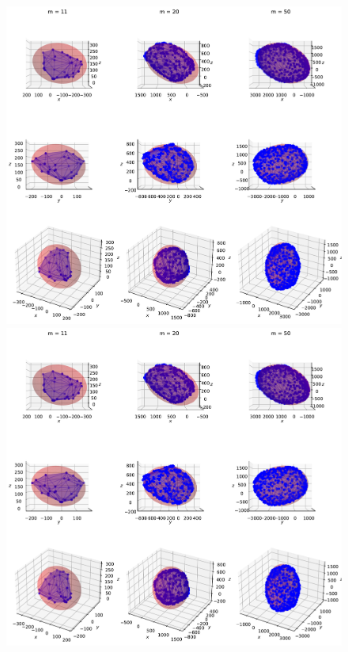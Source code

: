 \begin{figure}[!htb]
\begin{minipage}{1\linewidth}
        \includegraphics[trim={0 500 0 60},clip, width=0.9\linewidth]{img/chapter_3/myIma5_projection_constant.pdf}
    \end{minipage}
    \begin{minipage}{1\linewidth}
        \centering
        \includegraphics[trim={0 255 0 300},clip, width=0.9\linewidth]{img/chapter_3/myIma5_projection_constant.pdf}
    \end{minipage}
    \begin{minipage}{1\linewidth}

\end{minipage}
\end{figure}

